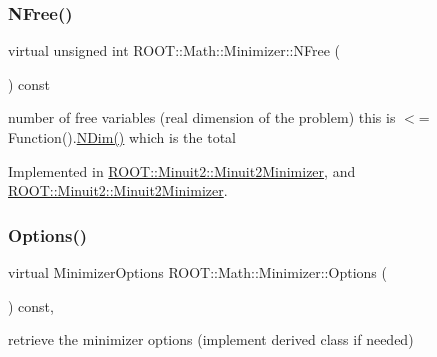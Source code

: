 \mbox{\label{classROOT_1_1Math_1_1Minimizer_a75a7cd8dc0d764ecc9d82dd8f83aab24}} 
\subsubsection{\texorpdfstring{NFree()}{NFree()}\hspace{0.1cm}{\footnotesize\ttfamily [2/2]}}
{\footnotesize\ttfamily virtual unsigned int R\+O\+O\+T\+::\+Math\+::\+Minimizer\+::\+N\+Free (\begin{DoxyParamCaption}{ }\end{DoxyParamCaption}) const\hspace{0.3cm}{\ttfamily [pure virtual]}}

number of free variables (real dimension of the problem) this is $<$= Function().\mbox{\hyperlink{classROOT_1_1Math_1_1Minimizer_aecb9b9ee5c6a9fd7db3196ae3ac5e335}{N\+Dim()}} which is the total 

Implemented in \mbox{\hyperlink{classROOT_1_1Minuit2_1_1Minuit2Minimizer_a0aa136c5a94d1e5c6bfcbfb98da7ad2d}{R\+O\+O\+T\+::\+Minuit2\+::\+Minuit2\+Minimizer}}, and \mbox{\hyperlink{classROOT_1_1Minuit2_1_1Minuit2Minimizer_a0aa136c5a94d1e5c6bfcbfb98da7ad2d}{R\+O\+O\+T\+::\+Minuit2\+::\+Minuit2\+Minimizer}}.

\mbox{\label{classROOT_1_1Math_1_1Minimizer_a9b0653bcf3d2c0b4df79c1db2068ff27}} 
\subsubsection{\texorpdfstring{Options()}{Options()}\hspace{0.1cm}{\footnotesize\ttfamily [1/2]}}
{\footnotesize\ttfamily virtual Minimizer\+Options R\+O\+O\+T\+::\+Math\+::\+Minimizer\+::\+Options (\begin{DoxyParamCaption}{ }\end{DoxyParamCaption}) const\hspace{0.3cm}{\ttfamily [inline]}, {\ttfamily [virtual]}}



retrieve the minimizer options (implement derived class if needed) 

